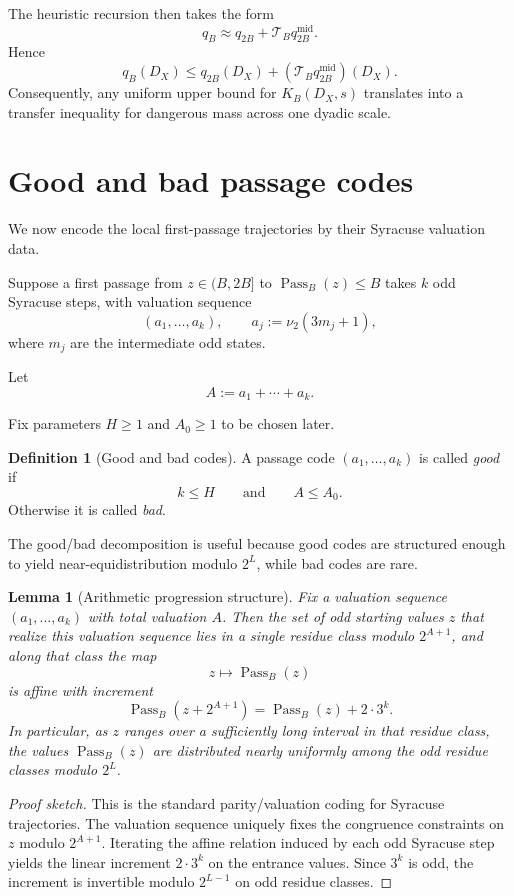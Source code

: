 \documentclass[11pt]{article}
\newtheorem{lemma}[theorem]{Lemma}
\theoremstyle{definition}
\newtheorem{definition}[theorem]{Definition}
\theoremstyle{remark}
\newcommand{\1}{\mathbf{1}}
\newcommand{\Pass}{\operatorname{Pass}}
\newcommand{\DX}{D_X}
\newcommand{\KB}{K_B}
\newcommand{\TB}{\mathcal T_B}
\begin{document}
The heuristic recursion then takes the form
\[
q_B \approx q_{2B} + \TB q_{2B}^{\mathrm{mid}}.
\]
Hence
\[
q_B(\DX)\le q_{2B}(\DX)+(\TB q_{2B}^{\mathrm{mid}})(\DX).
\]
Consequently, any uniform upper bound for $\KB(\DX,s)$ translates into a transfer inequality for dangerous mass across one dyadic scale.

\section{Good and bad passage codes}

We now encode the local first-passage trajectories by their Syracuse valuation data.

Suppose a first passage from $z\in(B,2B]$ to $\Pass_B(z)\le B$ takes $k$ odd Syracuse steps, with valuation sequence
\[
(a_1,\dots,a_k),\qquad a_j:=\nu_2(3m_j+1),
\]
where $m_j$ are the intermediate odd states.

Let
\[
A:=a_1+\cdots+a_k.
\]

Fix parameters $H\ge1$ and $A_0\ge1$ to be chosen later.

\begin{definition}[Good and bad codes]
A passage code $(a_1,\dots,a_k)$ is called \emph{good} if
\[
k\le H
\qquad\text{and}\qquad
A\le A_0.
\]
Otherwise it is called \emph{bad}.
\end{definition}

The good/bad decomposition is useful because good codes are structured enough to yield near-equidistribution modulo $2^L$, while bad codes are rare.

\begin{lemma}[Arithmetic progression structure]
Fix a valuation sequence $(a_1,\dots,a_k)$ with total valuation $A$. Then the set of odd starting values $z$ that realize this valuation sequence lies in a single residue class modulo $2^{A+1}$, and along that class the map
\[
z\mapsto \Pass_B(z)
\]
is affine with increment
\[
\Pass_B(z+2^{A+1})=\Pass_B(z)+2\cdot 3^k.
\]
In particular, as $z$ ranges over a sufficiently long interval in that residue class, the values $\Pass_B(z)$ are distributed nearly uniformly among the odd residue classes modulo $2^L$.
\end{lemma}

\begin{proof}[Proof sketch]
This is the standard parity/valuation coding for Syracuse trajectories. The valuation sequence uniquely fixes the congruence constraints on $z$ modulo $2^{A+1}$. Iterating the affine relation induced by each odd Syracuse step yields the linear increment $2\cdot 3^k$ on the entrance values. Since $3^k$ is odd, the increment is invertible modulo $2^{L-1}$ on odd residue classes.
\end{proof}
\end{document}
